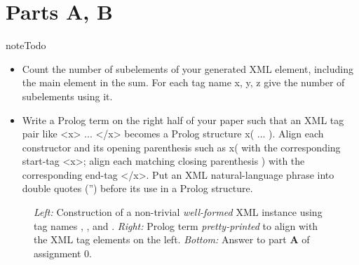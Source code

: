 \documentclass[letterpaper,10pt,english]{sphinxmanual}
\begin{document}
\section{Parts A, B}
\label{assign0:parts-a-b}
\begin{notice}{note}{Todo}
\begin{itemize}
\item {} 
Count the number of subelements of your generated XML element, including the main element in the sum. For each tag name x, y, z give the number of subelements using it.

\item {} 
Write a Prolog term on the right half of your paper such that an XML tag pair like \textless{}x\textgreater{} ... \textless{}/x\textgreater{} becomes a Prolog structure x( ... ). Align each constructor and its opening parenthesis such as x( with the corresponding start-tag \textless{}x\textgreater{}; align each matching closing parenthesis ) with the corresponding end-tag \textless{}/x\textgreater{}. Put an XML natural-language phrase into double quotes ('') before its use in a Prolog structure.

\end{itemize}
\end{notice}
\begin{figure}[htbp]
\centering
\capstart

\caption{\emph{Left:} Construction of a non-trivial \emph{well-formed} XML instance using tag names
, , and .  \emph{Right:} Prolog term \emph{pretty-printed} to align with the
XML tag elements on the left.  \emph{Bottom:} Answer to part \textbf{A} of assignment 0.}\end{figure}
\end{document}
